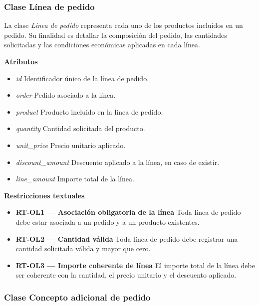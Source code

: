 \subsubsection{Clase Línea de pedido}

La clase \textit{Línea de pedido} representa cada uno de los productos incluidos en un pedido. Su finalidad es detallar la composición del pedido, las cantidades solicitadas y las condiciones económicas aplicadas en cada línea.

\textbf{Atributos}

\begin{itemize}
      \item \textit{id}
            Identificador único de la línea de pedido.
      \item \textit{order}
            Pedido asociado a la línea.
      \item \textit{product}
            Producto incluido en la línea de pedido.
      \item \textit{quantity}
            Cantidad solicitada del producto.
      \item \textit{unit\_price}
            Precio unitario aplicado.
      \item \textit{discount\_amount}
            Descuento aplicado a la línea, en caso de existir.
      \item \textit{line\_amount}
            Importe total de la línea.

\end{itemize}

\textbf{Restricciones textuales}

\begin{itemize}
      \item \textbf{RT-OL1 — Asociación obligatoria de la línea}
            Toda línea de pedido debe estar asociada a un pedido y a un producto existentes.
      \item \textbf{RT-OL2 — Cantidad válida}
            Toda línea de pedido debe registrar una cantidad solicitada válida y mayor que cero.
      \item \textbf{RT-OL3 — Importe coherente de línea}
            El importe total de la línea debe ser coherente con la cantidad, el precio unitario y el descuento aplicado.
\end{itemize}

\subsubsection{Clase Concepto adicional de pedido}

